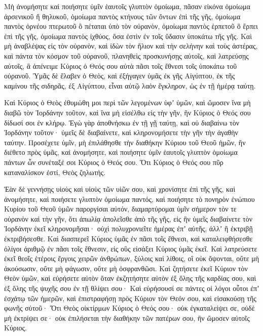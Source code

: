 {Μὴ ἀνομήσητε καὶ ποιήσητε ὑμῖν ἑαυτοῖς γλυπτὸν ὁμοίωμα, πᾶσαν εἰκόνα ὁμοίωμα ἀρσενικοῦ ἢ θηλυκοῦ,
ὁμοίωμα παντὸς κτήνους τῶν ὄντων ἐπὶ τῆς γῆς, ὁμοίωμα παντὸς ὀρνέου πτερωτοῦ ὃ πέταται ὑπὸ τὸν οὐρανὸν,
ὁμοίωμα παντὸς ἑρπετοῦ ὃ ἕρπει ἐπὶ τῆς γῆς, ὁμοίωμα παντὸς ἰχθύος, ὅσα ἐστὶν ἐν τοῖς ὕδασιν ὑποκάτω τῆς γῆς.
Καὶ μὴ ἀναβλέψας εἰς τὸν οὐρανὸν, καὶ ἰδὼν τὸν ἥλιον καὶ τὴν σελήνην καὶ τοὺς ἀστέρας, καὶ πάντα τὸν κόσμον τοῦ οὐρανοῦ, πλανηθεὶς προσκυνήσῃς αὐτοῖς, καὶ λατρεύσῃς αὐτοῖς, ἃ ἀπένειμε Κύριος ὁ Θεός σου αὐτὰ πᾶσι τοῖς ἔθνεσι τοῖς ὑποκάτω τοῦ οὐρανοῦ.
Ὑμᾶς δὲ ἔλαβεν ὁ Θεὸς, καὶ ἐξήγαγεν ὑμᾶς ἐκ γῆς Αἰγύπτου, ἐκ τῆς καμίνου τῆς σιδηρᾶς, ἐξ Αἰγύπτου, εἶναι αὐτῷ λαὸν ἔγκληρον, ὡς ἐν τῇ ἡμέρᾳ ταύτῃ.
\par }{\PP {}Καὶ Κύριος ὁ Θεὸς ἐθυμώθη μοι περὶ τῶν λεγομένων ὑφʼ ὑμῶν, καὶ ὤμοσεν ἵνα μὴ διαβῶ τὸν Ἰορδάνην τοῦτον, καὶ ἵνα μὴ εἰσέλθω εἰς τὴν γῆν, ἣν Κύριος ὁ Θεός σου δίδωσί σοι ἐν κλήρῳ.
Ἐγὼ γὰρ ἀποθνήσκω ἐν τῇ γῇ ταύτῃ, καὶ οὐ διαβαίνω τὸν Ἰορδάνην τοῦτον· ὑμεῖς δὲ διαβαίνετε, καὶ κληρονομήσετε τὴν γῆν τὴν ἀγαθὴν ταύτην.
Προσέχετε ὑμῖν, μὴ ἐπιλάθησθε τὴν διαθήκην Κύριου τοῦ Θεοῦ ἡμῶν, ἣν διέθετο πρὸς ὑμᾶς, καὶ ἀνομήσητε, καὶ ποιήσητε ὑμῖν ἑαυτοῖς γλυπτὸν ὁμοίωμα πάντων ὧν συνέταξέ σοι Κύριος ὁ Θεός σου.
Ὅτι Κύριος ὁ Θεός σου πῦρ καταναλίσκον ἐστί, Θεὸς ζηλωτής.
\par }{\PP {}Ἐὰν δὲ γεννήσῃς υἱοὺς καὶ υἱοὺς τῶν υἱῶν σου, καὶ χρονίσητε ἐπὶ τῆς γῆς, καὶ ἀνομήσητε, καὶ ποιήσετε γλυπτὸν ὁμοίωμα παντός, καὶ ποιήσητε τὸ πονηρὸν ἐνώπιου Κυρίου τοῦ
Θεοῦ ὑμῶν παροργίσαι αὐτόν, διαμαρτύρομαι ὑμῖν σήμερον τὸν τε οὐρανὸν καὶ τὴν γῆν, ὅτι ἀπωλίᾳ ἀπολεῖσθε ἀπὸ τῆς γῆς, εἰς ἣν ὑμεῖς διαβαίνετε τὸν Ἰορδάνην ἐκεῖ κληρονομῆσαι· οὐχὶ πολυχρονιεῖτε ἡμέρας ἐπʼ αὐτῆς, ἀλλʼ ἢ ἐκτριβῇ ἐκτριβήσεσθε.
Καὶ διασπερεῖ Κύριος ὑμᾶς ἐν πᾶσι τοῖς ἔθνεσι, καὶ καταλειφθήσεσθε ὀλίγοι ἀριθμῷ ἐν πᾶσι τοῖς ἔθνεσιν, εἰς οὓς εἰσάξει Κύριος ὑμᾶς ἐκεῖ.
Καὶ λατρεύσετε ἐκεῖ θεοῖς ἑτέροις ἔργοις χειρῶν ἀνθρώπων, ξύλοις καὶ λίθοις, οἳ οὐκ ὄψονται, οὔτε μὴ ἀκούσωσιν, οὔτε μὴ φάγωσιν, οὔτε μὴ ὀσφρανθῶσι.
Καὶ ζητήσετε ἐκεῖ Κύριον τὸν Θεὸν ὑμῶν, καὶ εὑρήσετε αὐτὸν ὅταν ἐκζητήσητε αὐτὸν ἐξ ὅλης τῆς καρδίας σου, καὶ ἐξ ὅλης τῆς ψυχῆς σου ἐν τῇ θλίψει σου·
Καὶ εὑρήσουσί σε πάντες οἱ λόγοι οὗτοι ἐπʼ ἐσχάτῳ τῶν ἡμερῶν, καὶ ἐπιστραφήσῃ πρὸς Κύριον τὸν Θεόν σου, καὶ εἰσακούσῃ τῆς φωνῆς σὐτοῦ·
Ὅτι Θεὸς οἰκτίρμων Κύριος ὁ Θεός σου· οὐκ ἐγκαταλείψει σε, οὐδὲ μὴ ἐκτρίψει σε· οὐκ ἐπιλήσεται τὴν διαθήκην τῶν πατέρων σου, ἣν ὤμοσεν αὐτοῖς Κύριος.
}
